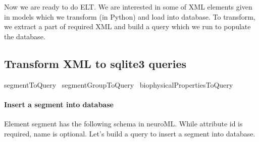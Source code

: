 \documentclass[]{article}%
\begin{document}
  Now we are ready to do ELT. We are interested in some of XML elements given in
  models which we transform (in Python) and load into database. To transform, we
  extract a part of required XML and build a query which we run to populate the
  database.

\subsection{Transform XML to sqlite3 queries}
\label{subsec:transform}

\nwenddocs{}\endmoddef\nwstartdeflinemarkup{}\nwenddeflinemarkup
\LA{}segmentToQuery~{\nwtagstyle{}}\RA{}
\LA{}segmentGroupToQuery~{\nwtagstyle{}}\RA{}
\LA{}biophysicalPropertiesToQuery~{\nwtagstyle{}}\RA{}

\eatline
{}\nwendcode{}\nwdocspar
\paragraph{Insert a segment into database}
    
    Element {\Tt{}segment\nwendquote} has the following schema in neuroML. While attribute
    {\Tt{}id\nwendquote} is required, {\Tt{}name\nwendquote} is optional. Let's build a query to insert a
    {\Tt{}segment\nwendquote} into database.


\end{document}
